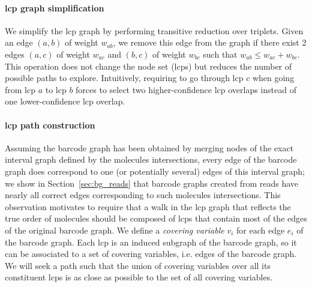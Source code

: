 \paragraph*{lcp graph simplification} We simplify the lcp graph by performing transitive reduction over triplets.
Given an edge $(a,b)$ of weight $w_{ab}$, we remove this edge from the graph if there exist 2 edges $(a,c)$ of weight $w_{ac}$ and $(b,c)$ of weight $w_{bc}$ such that $w_{ab} \leqslant w_{ac} + w_{bc}$.
This operation does not change the node set (lcps) but reduces the number of possible paths to explore.
Intuitively, requiring to go through lcp $c$ when going from lcp $a$ to lcp $b$ forces to select two higher-confidence lcp overlaps instead of one lower-confidence lcp overlap.

\paragraph*{lcp path construction}

Assuming the barcode graph has been obtained by merging nodes of the exact interval graph defined by the molecules intersections, every edge of the barcode graph does correspond to one (or potentially several) edges of this interval graph; we show in Section~\ref{sec:bg_reads} that barcode graphs created from reads have nearly all correct edges corresponding to such molecules intersections.
This observation motivates to require that a walk in the lcp graph that reflects the true order of molecules should be composed of lcps that contain most of the edges of the original barcode graph.
We define a \textit{covering variable} $v_i$ for each edge $e_i$ of the barcode graph.
Each lcp is an induced subgraph of the barcode graph, so it can be associated to a set of covering variables, i.e. edges of the barcode graph.
We will seek a path such that the union of covering variables over all its constituent lcps is as close as possible to the set of all covering variables.%

